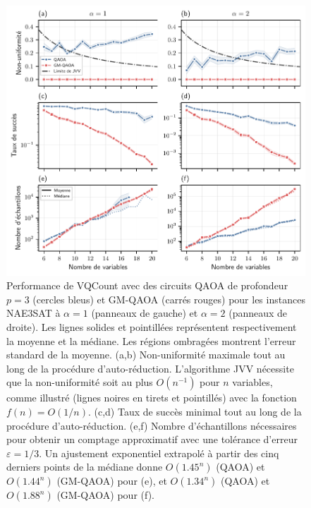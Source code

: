 \begin{figure}[ht!]
    \centering
    \includegraphics[width=1\textwidth]{figures/nae3sat-nonuniformity.pdf}
    \caption[Biais d'échantillonnage pour \#NAE3SAT]{Performance de VQCount avec des circuits QAOA de profondeur $p=3$ (cercles bleus) et GM-QAOA (carrés rouges) pour les instances NAE3SAT à $\alpha=1$ (panneaux de gauche) et $\alpha=2$ (panneaux de droite). Les lignes solides et pointillées représentent respectivement la moyenne et la médiane. Les régions ombragées montrent l'erreur standard de la moyenne. (a,b) Non-uniformité maximale tout au long de la procédure d'auto-réduction. L'algorithme JVV nécessite que la non-uniformité soit au plus $O(n^{-1})$ pour $n$ variables, comme illustré (lignes noires en tirets et pointillés) avec la fonction $f(n) = O(1/n)$. (c,d) Taux de succès minimal tout au long de la procédure d'auto-réduction. (e,f) Nombre d'échantillons nécessaires pour obtenir un comptage approximatif avec une tolérance d'erreur $\varepsilon = 1/3$. Un ajustement exponentiel extrapolé à partir des cinq derniers points de la médiane donne $O(1.45^n)$ (QAOA) et $O(1.44^n)$ (GM-QAOA) pour (e), et $O(1.34^n)$ (QAOA) et $O(1.88^n)$ (GM-QAOA) pour (f).}
    \label{fig:nae3sat-number-of-samples}
\end{figure}

